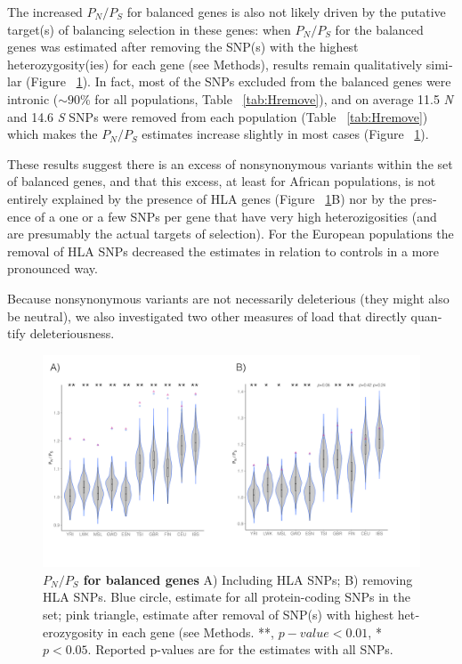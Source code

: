 \begin{refsection}
\begin{otherlanguage}{english}
The increased $P_{N}/P_{S}$ for balanced genes is also not likely driven by the putative target(s) of balancing selection in these genes: when $P_{N}/P_{S}$ for the balanced genes was estimated after removing the SNP(s) with the highest heterozygosity(ies) for each gene (see Methods), results remain qualitatively similar (Figure ~\ref{fig:PnPs_combo}). In fact, most of the SNPs excluded from the balanced genes were intronic ($\sim 90$\% for all populations, Table ~\ref{tab:Hremove}), and on average 11.5 \emph{N} and 14.6 \emph{S} SNPs were removed from each population (Table ~\ref{tab:Hremove}) which makes the $P_{N}/P_{S}$ estimates increase slightly in most cases (Figure ~\ref{fig:PnPs_combo}). 

These results suggest there is an excess of nonsynonymous variants within the set of balanced genes, and that this excess, at least for African populations, is not entirely explained by the presence of HLA genes (Figure ~\ref{fig:PnPs_combo}B) nor by the presence of a one or a few SNPs per gene that have very high heterozigosities (and are presumably the actual targets of selection). For the European populations the removal of HLA SNPs decreased the estimates in relation to controls in a more pronounced way.

Because nonsynonymous variants are not necessarily deleterious (they might also be neutral), we also investigated two other measures of load that directly quantify deleteriousness.

\begin{figure}
\includegraphics[]{chap3_folder/figures/PnPs_combo2.png}
\caption{\textbf{$P_{N}/P_{S}$ for balanced genes} A) Including HLA SNPs; B) removing HLA SNPs. Blue circle, estimate for all protein-coding SNPs in the set; pink triangle, estimate after removal of SNP(s) with highest heterozygosity in each gene (see Methods. **, $p-value<0.01$, *$p<0.05$. Reported p-values are for the estimates with all SNPs.}
\label{fig:PnPs_combo}
\end{figure}


\end{otherlanguage}
\end{refsection}
